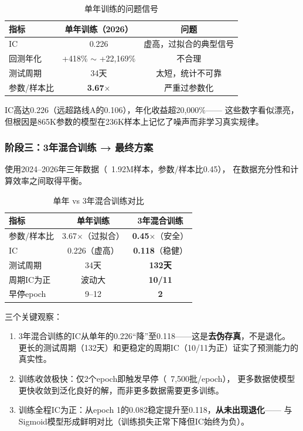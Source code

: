 \documentclass[12pt,a4paper]{ctexart}
\begin{document}
\begin{table}[htbp]
\centering
\caption{单年训练的问题信号}
\label{tab:wu_single_year}
\begin{tabular}{lcc}
\toprule
指标 & 单年训练（2026） & 问题 \\
\midrule
IC & 0.226 & 虚高，过拟合的典型信号 \\
回测年化 & +418\% $\sim$ +22,169\% & 不合理 \\
测试周期 & 34天 & 太短，统计不可靠 \\
参数/样本比 & \textbf{3.67$\times$} & 严重过参数化 \\
\bottomrule
\end{tabular}
\end{table}

IC高达0.226（远超路线A的0.106），年化收益超20,000\%——
这些数字看似漂亮，但根因是865K参数的模型在236K样本上记忆了噪声而非学习真实规律。

\subsubsection{阶段三：3年混合训练 → 最终方案}

使用2024--2026年三年数据（~1.92M样本，参数/样本比0.45），
在数据充分性和计算效率之间取得平衡。

\begin{table}[htbp]
\centering
\caption{单年 vs 3年混合训练对比}
\label{tab:wu_training_compare}
\begin{tabular}{lcc}
\toprule
指标 & 单年训练 & 3年混合训练 \\
\midrule
参数/样本比 & 3.67$\times$（过拟合） & \textbf{0.45$\times$}（安全） \\
IC & 0.226（虚高） & \textbf{0.118}（稳健） \\
测试周期 & 34天 & \textbf{132天} \\
周期IC为正 & 波动大 & \textbf{10/11} \\
早停epoch & 9--12 & \textbf{2} \\
\bottomrule
\end{tabular}
\end{table}

三个关键观察：
\begin{enumerate}[leftmargin=*]
    \item 3年混合训练的IC从单年的0.226“降”至0.118——这是\textbf{去伪存真}，不是退化。
          更长的测试周期（132天）和更稳定的周期IC（10/11为正）证实了预测能力的真实性。
    \item 训练收敛极快：仅2个epoch即触发早停（~7,500批/epoch），
          更多数据使模型更快收敛到泛化良好的解，而非更多数据需要更多训练。
    \item 训练全程IC为正：从epoch 1的0.082稳定提升至0.118，\textbf{从未出现退化}——
          与Sigmoid模型形成鲜明对比（训练损失正常下降但IC始终为负）。
\end{enumerate}
\end{document}
